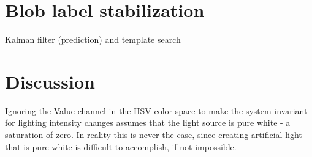 \section{Blob label stabilization}
Kalman filter (prediction) and template search

\section{Discussion}
Ignoring the Value channel in the HSV color space to make the system invariant for lighting intensity changes assumes that the light source is pure white - a saturation of zero. In reality this is never the case, since creating artificial light that is pure white is difficult to accomplish, if not impossible.
